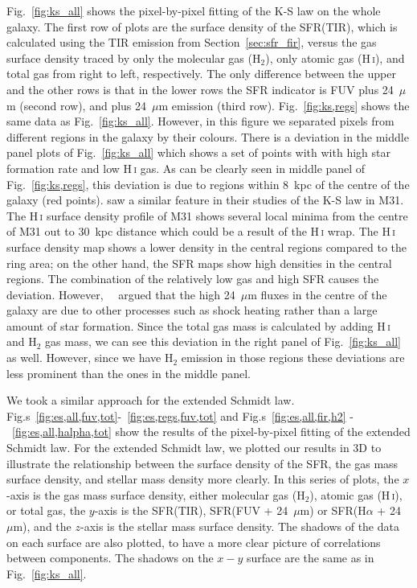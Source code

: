 Fig.~\ref{fig:ks_all} shows the pixel-by-pixel fitting of the K-S law on the whole galaxy. The first row of plots are the surface density of the SFR(TIR), which is calculated using the TIR emission from Section~\ref{sec:sfr_fir}, versus the gas surface density traced by only the molecular gas (H$_2$), only atomic gas (H\,{\textsc i}), and total gas from right to left, respectively. 
The only difference between the upper and the other rows is that in the lower rows the SFR indicator is FUV plus 24~$\mu$m (second row), and \halpha plus 24~$\mu$m emission (third row). Fig.~\ref{fig:ks,regs} shows the same data as Fig.~\ref{fig:ks_all}. However, in this figure we separated pixels from different regions in the galaxy by their colours. 
 There is a deviation in the middle panel plots of Fig.~\ref{fig:ks_all} which shows a set of points with with high star formation rate and low H\,{\textsc i} gas.
As can be clearly seen in middle panel of Fig.~\ref{fig:ks,regs}, this deviation is due to regions within 8~kpc of the centre of the galaxy (red points).
 \cite{Braun09} saw a similar feature in their studies of the K-S law in M31. 
The H\,{\textsc i} surface density profile of M31 \citep[see figure 16 in][]{Chemin09} shows several local minima from the centre of M31 out to 30~kpc distance which could be a result of the H\,{\textsc i} wrap. The H\,{\textsc i} surface density map shows a lower density in the central regions compared to the ring area; on the other hand, the SFR maps show high densities in the central regions. The combination of the relatively low gas and high SFR causes the deviation. However,~~\cite{Braun09} argued that the high 24~$\mu$m fluxes in the centre of the galaxy are due to other processes such as shock heating rather than a large amount of star formation.
Since the total gas mass is calculated by adding H\,{\textsc i} and H$_2$ gas mass, we can see this deviation in the right panel of Fig.~\ref{fig:ks_all} as well. However, since we have H$_2$ emission in those regions these deviations are less prominent than the ones in the middle panel.

We took a similar approach for the extended Schmidt law. Fig.s~\ref{fig:es,all,fuv,tot}-~\ref{fig:es,regs,fuv,tot} and Fig.s~\ref{fig:es,all,fir,h2} - ~\ref{fig:es,all,halpha,tot} show the results of the pixel-by-pixel fitting of the extended Schmidt law. For the extended Schmidt law, we plotted our results in 3D to illustrate the relationship between the surface density of the SFR, the gas mass surface density, and stellar mass density more clearly. In this series of plots, the $x$-axis is the gas mass surface density, either molecular gas (H$_2$), atomic gas (H\,{\textsc i}), or total gas, the $y$-axis is the SFR(TIR), SFR(FUV + 24~$\mu$m) or SFR(H$\alpha$ + 24~$\mu$m), and the $z$-axis is the stellar mass surface density. The shadows of the data on each surface are also plotted, to have a more clear picture of correlations between components. The shadows on the $x-y$ surface are the same as in Fig.~\ref{fig:ks_all}. 

